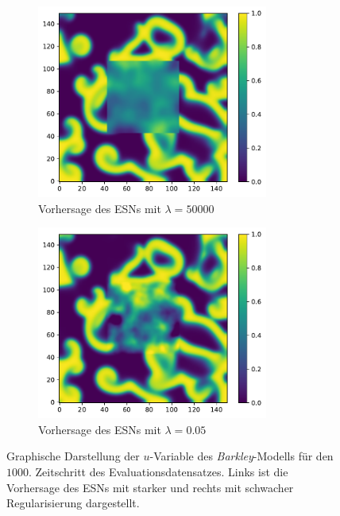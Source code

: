 \begin{figure}[H]
	\centering
	\begin{subfigure}{.5\textwidth}
		\centering
		\includegraphics[height=2.5in]{figures/results/inner_cross_prediction/barkley_u_inner_esn_high_penalty.pdf}
		\setcapmargin[1cm]{0.5cm}
		\caption{Vorhersage des \textsc{ESN}s mit $\lambda=50000$}
	\end{subfigure}%
	\begin{subfigure}{.5\textwidth}
		\centering
		\includegraphics[height=2.5in]{figures/results/inner_cross_prediction/barkley_u_inner_esn_low_penalty.pdf}
		\setcapmargin[1cm]{0.5cm}
  		\caption{Vorhersage des \textsc{ESN}s mit $\lambda=0.05$}
	\end{subfigure}
	\caption{Graphische Darstellung der $u$-Variable des \textit{Barkley}-Modells für den $1000$. Zeitschritt des Evaluationsdatensatzes. Links ist die Vorhersage des \textsc{ESN}s mit starker und rechts mit schwacher Regularisierung dargestellt.}
	\label{fig:exp_inner_cross_barkley_esn_comparison}
\end{figure} 



